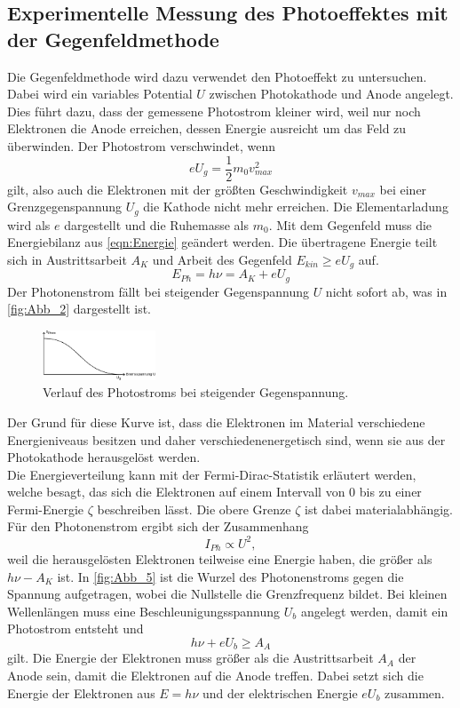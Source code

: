 \subsection{Experimentelle Messung des Photoeffektes mit der Gegenfeldmethode}
\label{sec:Gegenfeldmethode}
Die Gegenfeldmethode wird dazu verwendet den Photoeffekt zu untersuchen. Dabei wird ein variables Potential $U$
zwischen Photokathode und Anode angelegt. Dies führt dazu, dass der gemessene Photostrom kleiner wird, weil nur noch Elektronen 
die Anode erreichen, dessen Energie ausreicht um das Feld zu überwinden. Der Photostrom verschwindet, wenn
\begin{equation*}
    e U_g = \frac{1}{2} m_0 v^2_{max}
\end{equation*}
gilt, also auch die Elektronen mit der größten Geschwindigkeit $v_{max}$ bei einer Grenzgegenspannung $U_g$ die Kathode nicht mehr erreichen.
Die Elementarladung wird als $e$ dargestellt und die Ruhemasse als $m_0$. Mit dem Gegenfeld muss die Energiebilanz aus \autoref{eqn:Energie} geändert werden.
Die übertragene Energie teilt sich in Austrittsarbeit $A_K$ und Arbeit des Gegenfeld $E_{kin} \geq e U_g$ auf.
\begin{equation}
    E_{Ph} = h \nu = A_K + e U_g
\end{equation}
Der Photonenstrom fällt bei steigender Gegenspannung $U$ nicht sofort ab, was in \autoref{fig:Abb_2} dargestellt ist.
\begin{figure}[H]
    \centering
    \includegraphics[width=0.3\textwidth]{build/Abb_5.pdf}
    \caption{Verlauf des Photostroms bei steigender Gegenspannung.\cite{V500}}
    \label{fig:Abb_5}
\end{figure}
Der Grund für diese Kurve ist, dass die Elektronen im Material verschiedene Energieniveaus besitzen 
und daher verschiedenenergetisch sind, wenn sie aus der Photokathode herausgelöst werden.\\
Die Energieverteilung kann mit der Fermi-Dirac-Statistik erläutert werden, welche besagt, das sich die Elektronen auf einem Intervall
von 0 bis zu einer Fermi-Energie $\zeta$ beschreiben lässt. Die obere Grenze $\zeta$ ist dabei materialabhängig.
Für den Photonenstrom ergibt sich der Zusammenhang
\begin{equation}
    I_{Ph} \propto U^2,
\end{equation}
weil die herausgelösten Elektronen teilweise eine Energie haben, die größer als $h\nu -A_K$ ist.
In \autoref{fig:Abb_5} ist die Wurzel des Photonenstroms gegen die Spannung aufgetragen, wobei die Nullstelle  die 
Grenzfrequenz bildet.
Bei kleinen Wellenlängen muss eine Beschleunigungsspannung $U_b$ angelegt werden, damit ein Photostrom entsteht und
\begin{equation*}
    h\nu + e U_b \geq A_A
\end{equation*}
gilt. Die Energie der Elektronen muss größer als die Austrittsarbeit $A_A$ der Anode sein, damit die Elektronen auf die Anode treffen.
Dabei setzt sich die Energie der Elektronen aus $E = h \nu $ und der elektrischen Energie $e U_b$ zusammen.

